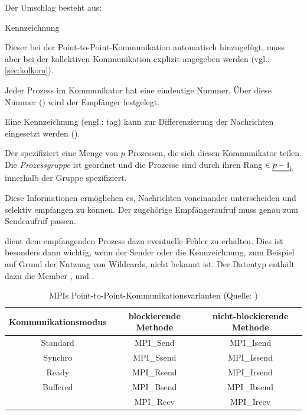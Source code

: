     Der Umschlag besteht aus:
    \begin{labeling}{Kennzeichnung}
     \item[Sender] Dieser bei der Point-to-Point-Kommunikation automatisch hinzugefügt, muss aber bei der kollektiven Kommunikation explizit angegeben werden (vgl.: \autoref{sec:kolkom}).
     \item[Empfänger] Jeder Prozess im Kommunikator hat eine eindeutige Nummer. Über diese Nummer () wird der Empfänger festgelegt.
     \item[Kennzeichnung] Eine Kennzeichnung (engl.: tag) kann zur Differenzierung der Nachrichten eingesetzt werden ().
     \item[Kommunikator] Der  spezifiziert eine Menge von $p$ Prozessen, die sich diesen Kommunikator teilen. Die \textit{Prozessgruppe} ist geordnet und
			 die Prozesse sind durch ihren Rang  $\in \nullhaken{p-1}$ innerhalb der Gruppe spezifiziert.
    \end{labeling}
    Diese Informationen ermöglichen es, Nachrichten voneinander unterscheiden und selektiv empfangen zu können. Der zugehörige Empfängeraufruf muss genau zum Sendeaufruf
    passen. \citep{mpiv31}
    
     dient dem empfangenden Prozess dazu eventuelle Fehler zu erhalten. Dies ist besonders dann wichtig, wenn der Sender oder die Kennzeichnung,
    zum Beispiel auf Grund der Nutzung von Wildcards, nicht bekannt ist. Der Datentyp  enthält dazu die Member ,  und .
    \citep{mpiv31}
    
    \begin{table}
      \begin{tabular}{|c|c|c|}
	\hline
	\textbf{Kommunikationsmodus}&\textbf{blockierende Methode}&\textbf{nicht-blockierende Methode}\\
	\hline
	Standard		    &MPI\_Send			  &MPI\_Isend			      \\
	\hline
	Synchro                     &MPI\_Ssend                   &MPI\_Issend                        \\
	\hline
	Ready                       &MPI\_Rsend                   &MPI\_Irsend                        \\
	\hline
	Buffered                    &MPI\_Bsend                   &MPI\_Ibsend                        \\
	\hline
	                            &MPI\_Recv                    &MPI\_Irecv                         \\
	\hline
      \end{tabular}
    \caption{MPIs Point-to-Point-Kommunikationsvarianten (Quelle: \citet{mpi_p2p})}
    \label{tab:p2p_comm}
    \end{table}
    
